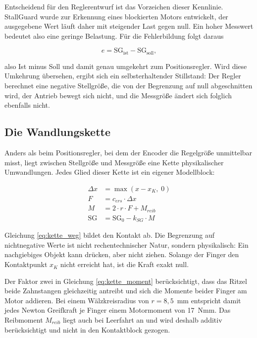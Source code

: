 Entscheidend für den Reglerentwurf ist das Vorzeichen dieser Kennlinie. StallGuard wurde
zur Erkennung eines blockierten Motors entwickelt, der ausgegebene Wert läuft daher mit
steigender Last gegen null. Ein hoher Messwert bedeutet also eine geringe Belastung. Für
die Fehlerbildung folgt daraus

\begin{equation}
    e = \mathrm{SG_{ist}} - \mathrm{SG_{soll}} ,
    \label{eq:sg_fehler}
\end{equation}

also Ist minus Soll und damit genau umgekehrt zum Positionsregler. Wird diese Umkehrung
übersehen, ergibt sich ein selbsterhaltender Stillstand: Der Regler berechnet eine
negative Stellgröße, die von der Begrenzung auf null abgeschnitten wird, der Antrieb
bewegt sich nicht, und die Messgröße ändert sich folglich ebenfalls nicht.

\subsection*{Die Wandlungskette}

Anders als beim Positionsregler, bei dem der Encoder die Regelgröße unmittelbar misst,
liegt zwischen Stellgröße und Messgröße eine Kette physikalischer Umwandlungen. Jedes
Glied dieser Kette ist ein eigener Modellblock:

\begin{align}
    \Delta x &= \max(x - x_K,\; 0) \label{eq:kette_weg}\\
    F        &= c_{ers} \cdot \Delta x \label{eq:kette_kraft}\\
    M        &= 2 \cdot r \cdot F + M_{reib} \label{eq:kette_moment}\\
    \mathrm{SG} &= \mathrm{SG_0} - k_{SG} \cdot M \label{eq:kette_sg}
\end{align}

Gleichung \ref{eq:kette_weg} bildet den Kontakt ab. Die Begrenzung auf nichtnegative Werte
ist nicht rechentechnischer Natur, sondern physikalisch: Ein nachgiebiges Objekt kann
drücken, aber nicht ziehen. Solange der Finger den Kontaktpunkt $x_K$ nicht erreicht hat,
ist die Kraft exakt null.

Der Faktor zwei in Gleichung \ref{eq:kette_moment} berücksichtigt, dass das Ritzel beide
Zahnstangen gleichzeitig antreibt und sich die Momente beider Finger am Motor addieren.
Bei einem Wälzkreisradius von $r = 8{,}5$~mm entspricht damit jedes Newton Greifkraft je
Finger einem Motormoment von 17~Nmm. Das Reibmoment $M_{reib}$ liegt auch bei Leerfahrt
an und wird deshalb additiv berücksichtigt und nicht in den Kontaktblock gezogen.

